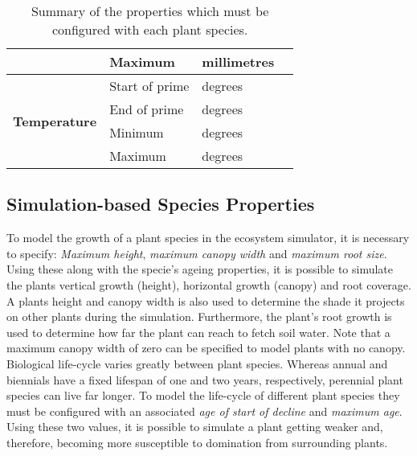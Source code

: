 \begin{table}[]
\begin{tabular}{|p{4cm}|p{7cm}|p{2cm}|p{0cm}|}
								& \multicolumn{1}{l|}{Maximum} & \multicolumn{1}{l|}{millimetres} \\
		\hline    
		\multirow{4}{*}{\textbf{Temperature}}
								& \multicolumn{1}{l|}{Start of prime} & \multicolumn{1}{l|}{degrees} \\\cline{2-3}
								& \multicolumn{1}{l|}{End of prime} & \multicolumn{1}{l|}{degrees} \\\cline{2-3}
								& \multicolumn{1}{l|}{Minimum} & \multicolumn{1}{l|}{degrees} \\\cline{2-3}
								& \multicolumn{1}{l|}{Maximum} & \multicolumn{1}{l|}{degrees} \\
		\hline                                                                           
		\end{tabular}
	\label{tab:specie_properties}	
	\caption{Summary of the properties which must be configured with each plant species.}
\end{table}

\subsection{Simulation-based Species Properties}

To model the growth of a plant species in the ecosystem simulator, it is necessary to specify: \textit{Maximum height}, \textit{maximum canopy width} and \textit{maximum root size}. Using these along with the specie's ageing properties, it is possible to simulate the plants vertical growth (height), horizontal growth (canopy) and root coverage. A plants height and canopy width is also used to determine the shade it projects on other plants during the simulation. Furthermore, the plant's root growth is used to determine how far the plant can reach to fetch soil water. Note that a maximum canopy width of zero can be specified to model plants with no canopy.\\

Biological life-cycle varies greatly between plant species. Whereas annual and biennials have a fixed lifespan of one and two years, respectively, perennial plant species can live far longer. To model the life-cycle of different plant species they must be configured with an associated \textit{age of start of decline} and \textit{maximum age}. Using these two values, it is possible to simulate a plant getting weaker and, therefore, becoming more susceptible to domination from surrounding plants.\\

